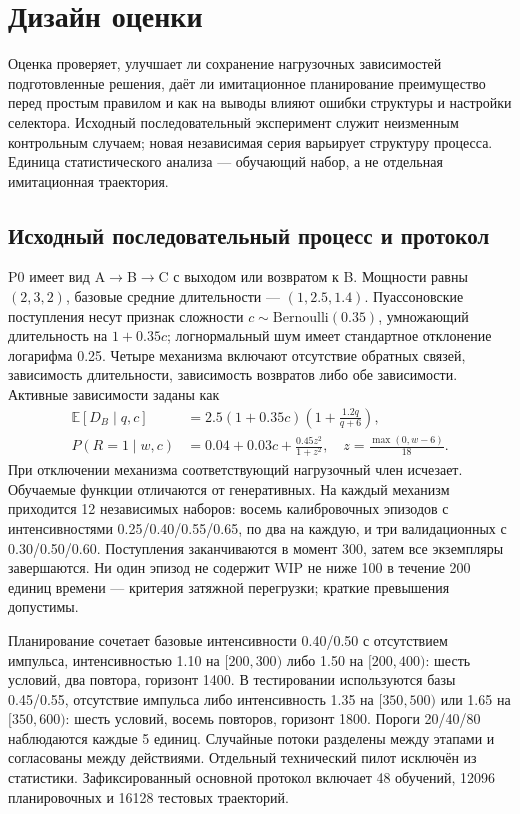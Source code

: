 \section{Дизайн оценки}
Оценка проверяет, улучшает ли сохранение нагрузочных зависимостей подготовленные решения, даёт ли имитационное планирование преимущество перед простым правилом и как на выводы влияют ошибки структуры и настройки селектора. Исходный последовательный эксперимент служит неизменным контрольным случаем; новая независимая серия варьирует структуру процесса. Единица статистического анализа — обучающий набор, а не отдельная имитационная траектория.

\subsection{Исходный последовательный процесс и протокол}
P0 имеет вид A$\rightarrow$B$\rightarrow$C с выходом или возвратом к B. Мощности равны $(2,3,2)$, базовые средние длительности — $(1,2.5,1.4)$. Пуассоновские поступления несут признак сложности $c\sim\mathrm{Bernoulli}(0.35)$, умножающий длительность на $1+0.35c$; логнормальный шум имеет стандартное отклонение логарифма 0.25. Четыре механизма включают отсутствие обратных связей, зависимость длительности, зависимость возвратов либо обе зависимости. Активные зависимости заданы как
\begin{align}\label{eq:truth}
\mathbb E[D_B\mid q,c]&=2.5(1+0.35c)\left(1+\frac{1.2q}{q+6}\right),\\
P(R=1\mid w,c)&=0.04+0.03c+\frac{0.45z^2}{1+z^2},\quad z=\frac{\max(0,w-6)}{18}.
\end{align}
При отключении механизма соответствующий нагрузочный член исчезает. Обучаемые функции отличаются от генеративных. На каждый механизм приходится 12 независимых наборов: восемь калибровочных эпизодов с интенсивностями 0.25/0.40/0.55/0.65, по два на каждую, и три валидационных с 0.30/0.50/0.60. Поступления заканчиваются в момент 300, затем все экземпляры завершаются. Ни один эпизод не содержит WIP не ниже 100 в течение 200 единиц времени — критерия затяжной перегрузки; краткие превышения допустимы.

Планирование сочетает базовые интенсивности 0.40/0.50 с отсутствием импульса, интенсивностью 1.10 на $[200,300)$ либо 1.50 на $[200,400)$: шесть условий, два повтора, горизонт 1400. В тестировании используются базы 0.45/0.55, отсутствие импульса либо интенсивность 1.35 на $[350,500)$ или 1.65 на $[350,600)$: шесть условий, восемь повторов, горизонт 1800. Пороги 20/40/80 наблюдаются каждые 5 единиц. Случайные потоки разделены между этапами и согласованы между действиями. Отдельный технический пилот исключён из статистики. Зафиксированный основной протокол включает 48 обучений, 12096 планировочных и 16128 тестовых траекторий.

